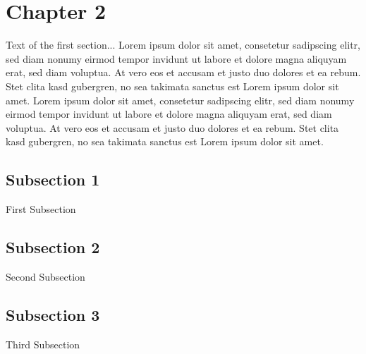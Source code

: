 \section{Chapter 2}\label{main section}

Text of the first section... Lorem ipsum dolor sit amet, consetetur sadipscing elitr, sed diam nonumy eirmod tempor invidunt ut labore et dolore magna aliquyam erat, sed diam voluptua. At vero eos et accusam et justo duo dolores et ea rebum. Stet clita kasd gubergren, no sea takimata sanctus est Lorem ipsum dolor sit amet. Lorem ipsum dolor sit amet, consetetur sadipscing elitr, sed diam nonumy eirmod tempor invidunt ut labore et dolore magna aliquyam erat, sed diam voluptua. At vero eos et accusam et justo duo dolores et ea rebum. Stet clita kasd gubergren, no sea takimata sanctus est Lorem ipsum dolor sit amet.

\subsection{Subsection 1}\label{unterabschnitt_1}

First Subsection

\subsection{Subsection 2}\label{unterabschnitt_2}

Second Subsection

\subsection{Subsection 3}\label{unterabschnitt_3}

Third Subsection
